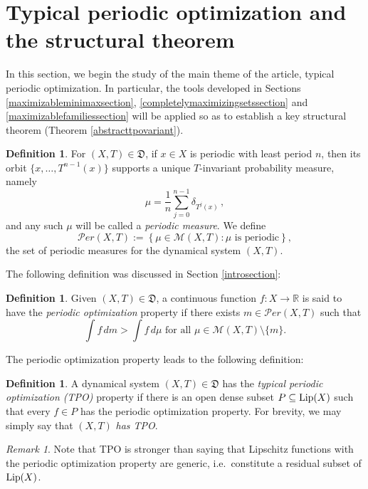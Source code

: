 \documentclass[reqno,11pt]{amsart}
\theoremstyle{definition}
\newtheorem{defn}[thm]{Definition}
\theoremstyle{remark}
\theoremstyle{remark}
\newtheorem{rem}[thm]{Remark}
\def \R {\mathbb R}
\def\m{\mathcal M}
\def\per{{\mathcal{P}er}}
\def\lip{{\rm Lip}}
\def\D{\mathfrak{D}}
\numberwithin{equation}{section}
\begin{document}
\section{ Typical periodic optimization and the structural theorem}\label{periodictposection}

In this section, we begin the
study of the main theme of the article, typical periodic optimization.
In particular, the tools developed in
Sections \ref{maximizableminimaxsection}, \ref{completelymaximizingsetssection} and \ref{maximizablefamiliessection}
will be applied so as to establish a key structural theorem (Theorem \ref{abstracttpovariant}).

\begin{defn}\label{periodic_measures_defn}
For $(X,T)\in\D$,
if $x\in X$ is periodic with least period $n$, then its orbit $\{x,\ldots,T^{n-1}(x)\}$
supports a unique $T$-invariant probability measure, namely
$$
\mu=\frac{1}{n} \sum_{j=0}^{n-1}\delta_{T^j(x)}\,,
$$
and any such $\mu$ will be called a \emph{periodic measure}. We define
$$
\per(X,T):=\left\{\mu\in\m(X,T): \mu \text{ is periodic}\right\},
$$
the set of periodic measures for the dynamical system $(X,T)$.
\end{defn}


The following definition was discussed in Section \ref{introsection}:

\begin{defn}
Given $(X,T)\in\D$,
 a continuous function $f:X\to\R$ is said to have the \emph{periodic optimization} property
 if there exists $m\in\per(X,T)$ such that 
$$\int f\, dm > \int f\, d\mu\text{ for all }\mu\in\m(X,T)\setminus\{m\}.
$$
\end{defn}

The periodic optimization property leads to the following definition:

\begin{defn}\label{tpodefn}
A dynamical system $(X,T)\in\D$ has the \emph{typical periodic optimization (TPO)} 
property
if there is an open dense subset $P\subseteq \lip(X)$ such that every $f\in P$ has the periodic
optimization property.
For brevity, we may simply say that $(X,T)$ \emph{has TPO}.
\end{defn}

\begin{rem}
Note that TPO is stronger than saying that Lipschitz functions with the periodic optimization property are generic,
i.e.~constitute a residual subset of $\lip(X)$. 
\end{rem}
\end{document}
